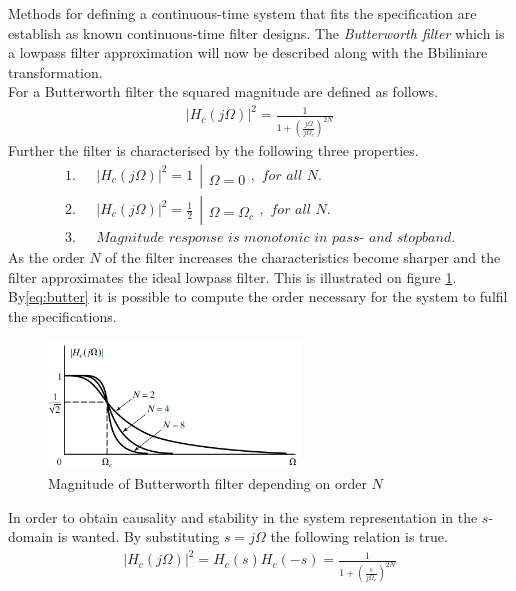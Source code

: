 Methods for defining a continuous-time system that fits the specification are establish as known continuous-time filter designs. The \textit{Butterworth filter} which is a lowpass filter approximation will now be described along with the Bbiliniare transformation.\\
For a Butterworth filter the squared magnitude are defined as follows.
\begin{align}\label{eq:butter}
|H_c(j\Omega)|^2=\frac{1}{1+\left( \frac{j\Omega}{j\Omega_c}\right)^{2N}}
\end{align} 
Further the filter is characterised by the following three properties.
\begin{align}
1.& \ \ \ |H_c(j\Omega)|^2 = 1 \  \ \left|\begin{matrix}
\\ 
\Omega=0
\end{matrix}\right. , \textit{ for all }N. \\
2.& \ \ \ |H_c(j\Omega)|^2 = \frac{1}{2} \  \ \left|\begin{matrix}
\\ 
\Omega=\Omega_c
\end{matrix}\right. , \textit{ for all }N. \\
3.& \ \ \ \textit{Magnitude response is monotonic in pass- and stopband.}
\end{align}
As the order $N$ of the filter increases the characteristics become sharper and the filter approximates the ideal lowpass filter. This is illustrated on figure \ref{fig:butter}. By\eqref{eq:butter} it is possible to compute the order necessary for the system to fulfil the specifications.            
\begin{figure}[H]
    \centering
    \includegraphics[width = 0.6\textwidth]{figures/butterworth.png}
    \caption{Magnitude of Butterworth filter depending on order $N$ }
    \label{fig:butter}
\end{figure} 
In order to obtain causality and stability in the system representation in the $s$-domain is wanted. By substituting $s=j\Omega$ the following relation is true.
\begin{align}
|H_c(j\Omega)|^2 = H_c(s)H_c(-s)= \frac{1}{1+\left( \frac{s}{j\Omega_c}\right)^{2N}}
\end{align} 
